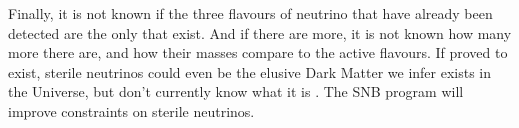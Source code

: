 Finally, it is not known if the three flavours of neutrino that have already been detected are the only that exist. And if there are more, it is not known how many more there are, and how their masses compare to the active flavours. If proved to exist, sterile neutrinos could even be the elusive Dark Matter we infer exists in the Universe, but don't currently know what it is \cite{darkmatter}. The SNB program will improve constraints on sterile neutrinos.

\newpage